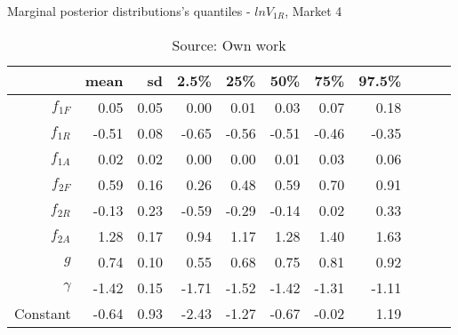 \begin{table}[H]
\caption{Marginal posterior distributions's quantiles - $ln V_{1R}$,  Market 4}
\centering
\begin{tabular}{rrrrrrrrrrr}
  \toprule
           & mean  & sd   & 2.5\% & 25\%  & 50\%  & 75\%  & 97.5\% \\ 
  \hline
  $f_{1F}$ & 0.05  & 0.05 & 0.00  & 0.01  & 0.03  & 0.07  & 0.18  \\ 
  $f_{1R}$ & -0.51 & 0.08 & -0.65 & -0.56 & -0.51 & -0.46 & -0.35 \\ 
  $f_{1A}$ & 0.02  & 0.02 & 0.00  & 0.00  & 0.01  & 0.03  & 0.06  \\ 
  $f_{2F}$ & 0.59  & 0.16 & 0.26  & 0.48  & 0.59  & 0.70  & 0.91  \\ 
  $f_{2R}$ & -0.13 & 0.23 & -0.59 & -0.29 & -0.14 & 0.02  & 0.33  \\ 
  $f_{2A}$ & 1.28  & 0.17 & 0.94  & 1.17  & 1.28  & 1.40  & 1.63  \\ 
  $g$      & 0.74  & 0.10 & 0.55  & 0.68  & 0.75  & 0.81  & 0.92  \\ 
  $\gamma$ & -1.42 & 0.15 & -1.71 & -1.52 & -1.42 & -1.31 & -1.11 \\ 
  Constant & -0.64 & 0.93 & -2.43 & -1.27 & -0.67 & -0.02 & 1.19  \\ 
     \bottomrule
\end{tabular}
\caption*{Source: Own work}
\end{table}
